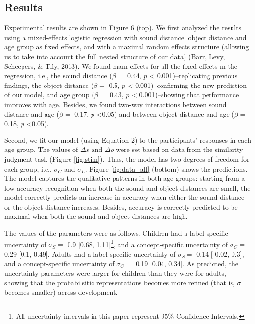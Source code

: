 \documentclass[10pt, letterpaper]{article}
\begin{document}
\subsection{Results}\label{results}

Experimental results are shown in Figure 6 (top). We first analyzed the
results using a mixed-effects logistic regression with sound distance,
object distance and age group as fixed effects, and with a maximal
random effects structure (allowing us to take into account the full
nested structure of our data) (Barr, Levy, Scheepers, \& Tily, 2013). We
found main effects for all the fixed effects in the regression, i.e.,
the sound distance (\(\beta =\) 0.44, \(p\) \textless{}
0.001)--replicating previous findings, the object distance (\(\beta =\)
0.5, \(p\) \textless{} 0.001)--confirming the new prediction of our
model, and age group (\(\beta =\) 0.43, \(p\) \textless{}
0.001)--showing that performance improves with age. Besides, we found
two-way interactions between sound distance and age (\(\beta =\) 0.17,
\(p\) \textless{}0.05) and between object distance and age (\(\beta =\)
0.18, \(p\) \textless{}0.05).

Second, we fit our model (using Equation 2) to the participants'
responses in each age group. The values of \(\Delta s\) and \(\Delta o\)
were set based on data from the similarity judgment task (Figure
\ref{fig:stim}). Thus, the model has two degrees of freedom for each
group, i.e., \(\sigma_C\) and \(\sigma_L\). Figure \ref{fig:data_all}
(bottom) shows the predictions. The model captures the qualitative
patterns in both age groups: starting from a low accuracy recognition
when both the sound and object distances are small, the model correctly
predicts an increase in accuracy when either the sound distance or the
object distance increases. Besides, accuracy is correctly predicted to
be maximal when both the sound and object distances are high.

The values of the parameters were as follows. Children had a
label-specific uncertainty of \(\sigma_S =\) 0.9 {[}0.68,
1.11{]}\footnote{All uncertainty intervals in this paper represent 95\% Confidence Intervals.},
and a concept-specific uncertainty of \(\sigma_C =\) 0.29 {[}0.1,
0.49{]}. Adults had a label-specific uncertainty of \(\sigma_S =\) 0.14
{[}-0.02, 0.3{]}, and a concept-specific uncertainty of \(\sigma_C =\)
0.19 {[}0.04, 0.34{]}. As predicted, the uncertainty parameters were
larger for children than they were for adults, showing that the
probabilsitic representations becomes more refined (that is, \(\sigma\)
becomes smaller) across development.
\end{document}
